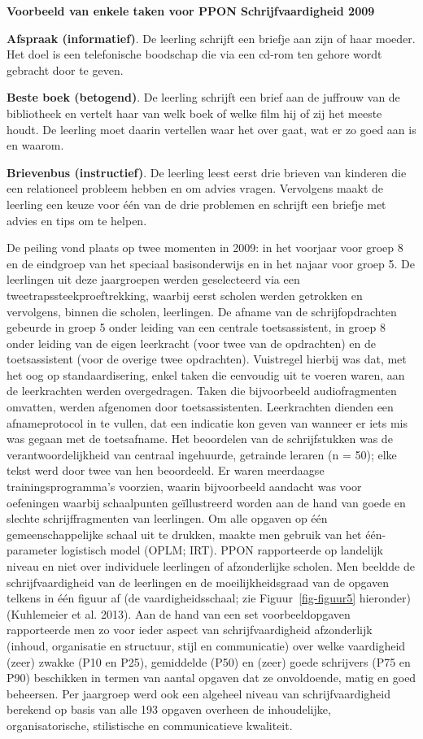 \documentclass[
  letterpaper,
]{report}
\begin{document}
\leavevmode{}%
\textbf{Voorbeeld van enkele taken voor PPON Schrijfvaardigheid 2009}

\textbf{Afspraak (informatief)}. De leerling schrijft een briefje aan
zijn of haar moeder. Het doel is een telefonische boodschap die via een
cd-rom ten gehore wordt gebracht door te geven.

\textbf{Beste boek (betogend)}. De leerling schrijft een brief aan de
juffrouw van de bibliotheek en vertelt haar van welk boek of welke film
hij of zij het meeste houdt. De leerling moet daarin vertellen waar het
over gaat, wat er zo goed aan is en waarom.

\textbf{Brievenbus (instructief)}. De leerling leest eerst drie brieven
van kinderen die een relationeel probleem hebben en om advies vragen.
Vervolgens maakt de leerling een keuze voor één van de drie problemen en
schrijft een briefje met advies en tips om te helpen.

De peiling vond plaats op twee momenten in 2009: in het voorjaar voor
groep 8 en de eindgroep van het speciaal basisonderwijs en in het najaar
voor groep 5. De leerlingen uit deze jaargroepen werden geselecteerd via
een tweetrapssteekproeftrekking, waarbij eerst scholen werden getrokken
en vervolgens, binnen die scholen, leerlingen. De afname van de
schrijfopdrachten gebeurde in groep 5 onder leiding van een centrale
toetsassistent, in groep 8 onder leiding van de eigen leerkracht (voor
twee van de opdrachten) en de toetsassistent (voor de overige twee
opdrachten). Vuistregel hierbij was dat, met het oog op
standaardisering, enkel taken die eenvoudig uit te voeren waren, aan de
leerkrachten werden overgedragen. Taken die bijvoorbeeld audiofragmenten
omvatten, werden afgenomen door toetsassistenten. Leerkrachten dienden
een afnameprotocol in te vullen, dat een indicatie kon geven van wanneer
er iets mis was gegaan met de toetsafname. Het beoordelen van de
schrijfstukken was de verantwoordelijkheid van centraal ingehuurde,
getrainde leraren (n = 50); elke tekst werd door twee van hen
beoordeeld. Er waren meerdaagse trainingsprogramma's voorzien, waarin
bijvoorbeeld aandacht was voor oefeningen waarbij schaalpunten
geïllustreerd worden aan de hand van goede en slechte schrijffragmenten
van leerlingen. Om alle opgaven op één gemeenschappelijke schaal uit te
drukken, maakte men gebruik van het één-parameter logistisch model
(OPLM; IRT). PPON rapporteerde op landelijk niveau en niet over
individuele leerlingen of afzonderlijke scholen. Men beeldde de
schrijfvaardigheid van de leerlingen en de moeilijkheidsgraad van de
opgaven telkens in één figuur af (de vaardigheidsschaal; zie
Figuur~\ref{fig-figuur5} hieronder)(Kuhlemeier et al. 2013). Aan de hand
van een set voorbeeldopgaven rapporteerde men zo voor ieder aspect van
schrijfvaardigheid afzonderlijk (inhoud, organisatie en structuur, stijl
en communicatie) over welke vaardigheid (zeer) zwakke (P10 en P25),
gemiddelde (P50) en (zeer) goede schrijvers (P75 en P90) beschikken in
termen van aantal opgaven dat ze onvoldoende, matig en goed beheersen.
Per jaargroep werd ook een algeheel niveau van schrijfvaardigheid
berekend op basis van alle 193 opgaven overheen de inhoudelijke,
organisatorische, stilistische en communicatieve kwaliteit.
\end{document}
